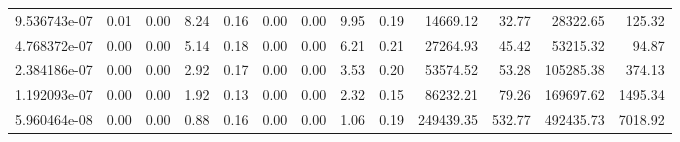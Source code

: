\begin{tabular}{lrrrrrrrrrrrr}
9.536743e-07 &        0.01 &        0.00 &          8.24 &          0.16 &           0.00 &           0.00 &         9.95 &         0.19 &         14669.12 &            32.77 &        28322.65 &          125.32 \\
4.768372e-07 &        0.00 &        0.00 &          5.14 &          0.18 &           0.00 &           0.00 &         6.21 &         0.21 &         27264.93 &            45.42 &        53215.32 &           94.87 \\
2.384186e-07 &        0.00 &        0.00 &          2.92 &          0.17 &           0.00 &           0.00 &         3.53 &         0.20 &         53574.52 &            53.28 &       105285.38 &          374.13 \\
1.192093e-07 &        0.00 &        0.00 &          1.92 &          0.13 &           0.00 &           0.00 &         2.32 &         0.15 &         86232.21 &            79.26 &       169697.62 &         1495.34 \\
5.960464e-08 &        0.00 &        0.00 &          0.88 &          0.16 &           0.00 &           0.00 &         1.06 &         0.19 &        249439.35 &           532.77 &       492435.73 &         7018.92 \\
\bottomrule
\end{tabular}
